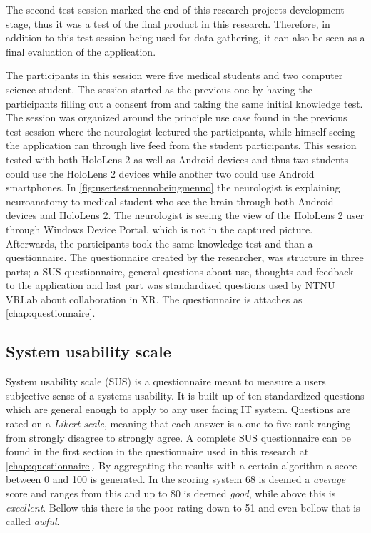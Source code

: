 The second test session marked the end of this research projects development stage, thus it was a test of the final product in this research. Therefore, in addition to this test session being used for data gathering, it can also be seen as a final evaluation of the application. 

The participants in this session were five medical students and two computer science student. The session started as the previous one by having the participants filling out a consent from and taking the same initial knowledge test. 
The session was organized around the principle use case found in the previous test session where the neurologist lectured the participants, while himself seeing the application ran through live feed from the student participants.
This session tested with both HoloLens 2 as well as Android devices and thus two students could use the HoloLens 2 devices while another two could use Android smartphones. In \autoref{fig:usertestmennobeingmenno} the neurologist is explaining neuroanatomy to medical student who see the brain through both Android devices and HoloLens 2. The neurologist is seeing the view of the HoloLens 2 user through Windows Device Portal, which is not in the captured picture.
Afterwards, the participants took the same knowledge test and than a questionnaire. The questionnaire created by the researcher, was structure in three parts; a SUS questionnaire, general questions about use, thoughts and feedback to the application and last part was standardized questions used by NTNU VRLab about collaboration in XR. The questionnaire is attaches as \autoref{chap:questionnaire}.

\subsection{System usability scale}

System usability scale (SUS) is a questionnaire meant to measure a users subjective sense of a systems usability. It is built up of ten standardized questions which are general enough to apply to any user facing IT system. Questions are rated on a \textit{Likert scale}, meaning that each answer is a one to five rank ranging from strongly disagree to strongly agree. A complete SUS questionnaire can be found in the first section in the questionnaire used in this research at \autoref{chap:questionnaire}. By aggregating the results with a certain algorithm a score between 0 and 100 is generated. In the scoring system 68 is deemed a \textit{average} score and ranges from this and up to 80 is deemed \textit{good}, while above this is \textit{excellent}. Bellow this there is the {poor} rating down to 51 and even bellow that is called \textit{awful}.